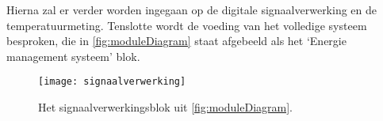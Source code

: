 Hierna zal er verder worden ingegaan op de digitale signaalverwerking en de temperatuurmeting. Tenslotte wordt de voeding van het volledige systeem besproken, die in \cref{fig:moduleDiagram} staat afgebeeld als het `Energie management systeem' blok.

\begin{figure}[!htbp]
    \centering
    \texttt{[image: signaalverwerking]}
    \caption{Het signaalverwerkingsblok uit \cref{fig:moduleDiagram}.}
    \label{fig:analogeBewerkingsFunctie}
\end{figure}



















%
